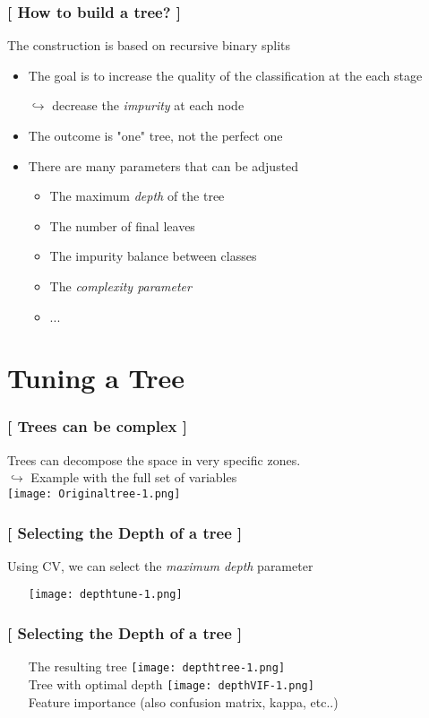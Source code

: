 \documentclass[xcolor=x11names,compress]{beamer}
\renewcommand{\(}{\begin{columns}}
\renewcommand{\)}{\end{columns}}
\newcommand{\<}[1]{\begin{column}{#1}}
\renewcommand{\>}{\end{column}}
\begin{document}
\begin{frame}
\frametitle{\textcolor{brique}{[ How to build a tree? ]}}
The construction is based on recursive binary splits
\pause
\begin{itemize}[<+->]
    \item The goal is to increase the quality of the classification at the each stage
    \item[$\hookrightarrow$] decrease the \textit{impurity} at each node
    \item The outcome is "one" tree, not the perfect one
    \item  There are many parameters that can be adjusted
    \begin{itemize}[<+->]
        \item The maximum \textit{depth} of the tree
        \item The number of final leaves
        \item The impurity balance between classes
        \item The \textit{complexity parameter}
        \item ...
    \end{itemize}
\end{itemize}
\end{frame}

\section{Tuning a Tree}

\begin{frame}
\frametitle{\textcolor{brique}{[ Trees can be complex ]}}
Trees can decompose the space in very specific zones.\\
 $\hookrightarrow$ Example with  the full set of variables\\

\texttt{[image: Originaltree-1.png]}
\end{frame}


\begin{frame}
\frametitle{\textcolor{brique}{[ Selecting the \textbf{Depth} of a tree ]}}
Using CV, we can select the \textit{maximum depth} parameter
\pause
\begin{itemize}[<+->]
    \item[] \texttt{[image: depthtune-1.png]}
\end{itemize}
\end{frame}


\begin{frame}
\frametitle{\textcolor{brique}{[ Selecting the \textbf{Depth} of a tree ]}}
\pause
\begin{itemize}
\item[] The resulting tree
   {\texttt{[image: depthtree-1.png]} \\ }
   {Tree with optimal depth}
   {\texttt{[image: depthVIF-1.png]} \\ }
   {Feature importance (also confusion matrix, kappa, etc..)}
\end{itemize}
\end{frame}
\end{document}
